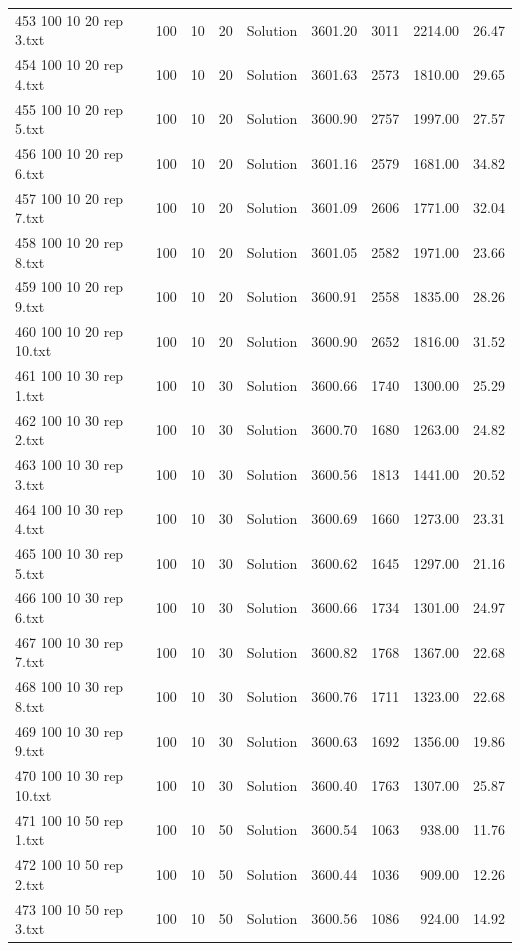 \begin{longtable}{lrrllrrrr}
453 100 10 20 rep 3.txt & 100 & 10 & 20 & Solution & 3601.20 & 3011 & 2214.00 & 26.47\\
454 100 10 20 rep 4.txt & 100 & 10 & 20 & Solution & 3601.63 & 2573 & 1810.00 & 29.65\\
455 100 10 20 rep 5.txt & 100 & 10 & 20 & Solution & 3600.90 & 2757 & 1997.00 & 27.57\\
456 100 10 20 rep 6.txt & 100 & 10 & 20 & Solution & 3601.16 & 2579 & 1681.00 & 34.82\\
457 100 10 20 rep 7.txt & 100 & 10 & 20 & Solution & 3601.09 & 2606 & 1771.00 & 32.04\\
458 100 10 20 rep 8.txt & 100 & 10 & 20 & Solution & 3601.05 & 2582 & 1971.00 & 23.66\\
459 100 10 20 rep 9.txt & 100 & 10 & 20 & Solution & 3600.91 & 2558 & 1835.00 & 28.26\\
460 100 10 20 rep 10.txt & 100 & 10 & 20 & Solution & 3600.90 & 2652 & 1816.00 & 31.52\\
461 100 10 30 rep 1.txt & 100 & 10 & 30 & Solution & 3600.66 & 1740 & 1300.00 & 25.29\\
462 100 10 30 rep 2.txt & 100 & 10 & 30 & Solution & 3600.70 & 1680 & 1263.00 & 24.82\\
463 100 10 30 rep 3.txt & 100 & 10 & 30 & Solution & 3600.56 & 1813 & 1441.00 & 20.52\\
464 100 10 30 rep 4.txt & 100 & 10 & 30 & Solution & 3600.69 & 1660 & 1273.00 & 23.31\\
465 100 10 30 rep 5.txt & 100 & 10 & 30 & Solution & 3600.62 & 1645 & 1297.00 & 21.16\\
466 100 10 30 rep 6.txt & 100 & 10 & 30 & Solution & 3600.66 & 1734 & 1301.00 & 24.97\\
467 100 10 30 rep 7.txt & 100 & 10 & 30 & Solution & 3600.82 & 1768 & 1367.00 & 22.68\\
468 100 10 30 rep 8.txt & 100 & 10 & 30 & Solution & 3600.76 & 1711 & 1323.00 & 22.68\\
469 100 10 30 rep 9.txt & 100 & 10 & 30 & Solution & 3600.63 & 1692 & 1356.00 & 19.86\\
470 100 10 30 rep 10.txt & 100 & 10 & 30 & Solution & 3600.40 & 1763 & 1307.00 & 25.87\\
471 100 10 50 rep 1.txt & 100 & 10 & 50 & Solution & 3600.54 & 1063 & 938.00 & 11.76\\
472 100 10 50 rep 2.txt & 100 & 10 & 50 & Solution & 3600.44 & 1036 & 909.00 & 12.26\\
473 100 10 50 rep 3.txt & 100 & 10 & 50 & Solution & 3600.56 & 1086 & 924.00 & 14.92\\

\end{longtable}
